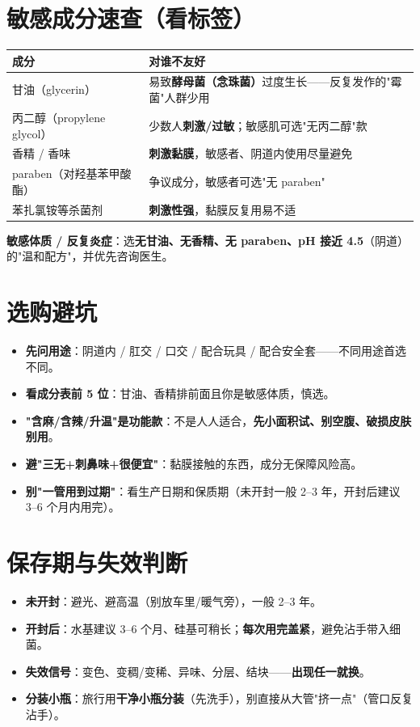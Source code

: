 \documentclass[12pt,UTF8,openany]{ctexbook}
\begin{document}
\section{敏感成分速查（看标签）}
\begin{tabularx}{\textwidth}{X X}
\toprule
\textbf{成分} & \textbf{对谁不友好} \\
\midrule
甘油（glycerin） & 易致\textbf{酵母菌（念珠菌）}过度生长——反复发作的"霉菌"人群少用 \\
丙二醇（propylene glycol） & 少数人\textbf{刺激/过敏}；敏感肌可选"无丙二醇"款 \\
香精 / 香味 & \textbf{刺激黏膜}，敏感者、阴道内使用尽量避免 \\
paraben（对羟基苯甲酸酯） & 争议成分，敏感者可选"无 paraben" \\
苯扎氯铵等杀菌剂 & \textbf{刺激性强}，黏膜反复用易不适 \\
\bottomrule
\end{tabularx}
\par\smallskip
\textbf{敏感体质 / 反复炎症}：选\textbf{无甘油、无香精、无 paraben、pH 接近 4.5}（阴道）的"温和配方"，并优先咨询医生。

\section{选购避坑}
\begin{itemize}[leftmargin=2em,itemsep=0.3em]
  \item \textbf{先问用途}：阴道内 / 肛交 / 口交 / 配合玩具 / 配合安全套——不同用途首选不同。
  \item \textbf{看成分表前 5 位}：甘油、香精排前面且你是敏感体质，慎选。
  \item \textbf{"含麻/含辣/升温"是功能款}：不是人人适合，\textbf{先小面积试、别空腹、破损皮肤别用}。
  \item \textbf{避"三无+刺鼻味+很便宜"}：黏膜接触的东西，成分无保障风险高。
  \item \textbf{别"一管用到过期"}：看生产日期和保质期（未开封一般 2--3 年，开封后建议 3--6 个月内用完）。
\end{itemize}

\section{保存期与失效判断}
\begin{itemize}[leftmargin=2em,itemsep=0.3em]
  \item \textbf{未开封}：避光、避高温（别放车里/暖气旁），一般 2--3 年。
  \item \textbf{开封后}：水基建议 3--6 个月、硅基可稍长；\textbf{每次用完盖紧}，避免沾手带入细菌。
  \item \textbf{失效信号}：变色、变稠/变稀、异味、分层、结块——\textbf{出现任一就换}。
  \item \textbf{分装小瓶}：旅行用\textbf{干净小瓶分装}（先洗手），别直接从大管"挤一点"（管口反复沾手）。
\end{itemize}
\end{document}

